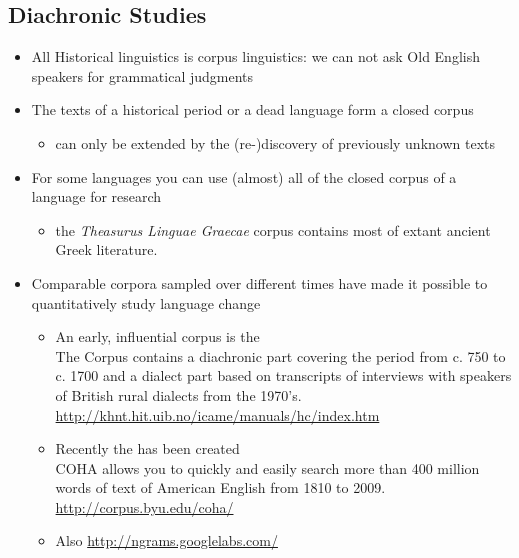 \documentclass[a4paper,landscape,headrule,footrule,dvips]{foils}
\begin{document}
\begin{CJK}{UTF8}{min}
\section{Diachronic Studies}
\MyLogo{}

\begin{itemize}
\item All Historical linguistics is corpus linguistics: we can not ask
  Old English speakers for grammatical judgments
\item The texts of a historical period or a dead language form a closed corpus 
  \begin{itemize}  \item  can only be extended by the (re-)discovery of previously unknown texts
  \end{itemize}
\item For some languages you can  use (almost) all of the closed corpus of a language for research 
  \begin{itemize}
  \item  the \textit{Theasurus Linguae Graecae} corpus contains most of extant ancient Greek literature.
  \end{itemize}
\end{itemize}


\begin{itemize}
\item Comparable corpora sampled over different times have made it
  possible to quantitatively study language change %
\begin{itemize}
\item An early, influential corpus is the 
  \\The Corpus contains a diachronic part covering the period from c. 750 to c. 1700 and a dialect part based on transcripts of interviews with speakers of British rural dialects from the 1970's.
  \\ \url{http://khnt.hit.uib.no/icame/manuals/hc/index.htm} 
\item Recently the  has been created
\\ COHA allows you to quickly and easily search more than 400 million words of text of American English from 1810 to 2009. 
\\ \url{http://corpus.byu.edu/coha/}
\item Also \url{http://ngrams.googlelabs.com/}
\end{itemize}
\end{itemize}



\end{CJK}
\end{document}
